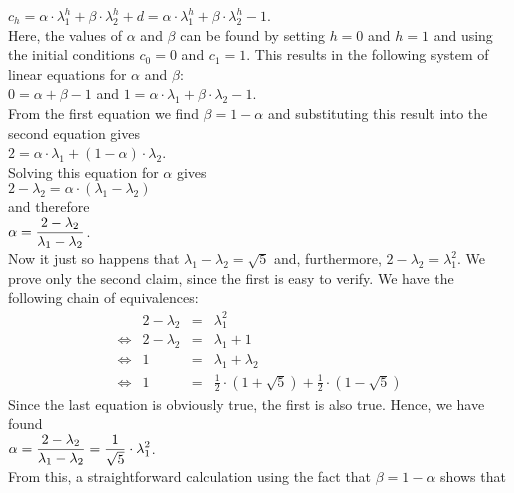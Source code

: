 $c_h = \alpha \cdot \lambda_1^h + \beta \cdot \lambda_2^h + d =\alpha \cdot \lambda_1^h + \beta \cdot \lambda_2^h - 1$.
\\[0.2cm]
Here, the values of $\alpha$ and $\beta$ can be found by setting $h=0$ and $h=1$ and using the
initial conditions $c_0 = 0$ and $c_1 = 1$.  This results in
the following system of linear equations for  $\alpha$ and $\beta$:
\\[0.2cm]
\hspace*{1.3cm}
$0 = \alpha + \beta - 1$ \quad and \quad
$1 = \alpha \cdot \lambda_1 + \beta \cdot \lambda_2 - 1$.
\\[0.2cm]
From the first equation we find $\beta = 1-\alpha$ and substituting this result into the second equation
gives
\\[0.2cm]
\hspace*{1.3cm}
$2 = \alpha \cdot \lambda_1 + (1-\alpha) \cdot \lambda_2$.
\\[0.2cm]
Solving this equation for $\alpha$ gives
\\[0.2cm]
\hspace*{1.3cm}
$2 - \lambda_2 = \alpha \cdot (\lambda_1 - \lambda_2)$
\\[0.2cm]
and therefore
\\[0.2cm]
\hspace*{1.3cm}
$\displaystyle \alpha = \frac{2 - \lambda_2}{\lambda_1 - \lambda_2}$.
\\[0.2cm]
Now it just so happens that $\lambda_1 - \lambda_2 = \sqrt{5}$ and, furthermore, $2 - \lambda_2 = \lambda_1^2$.
We prove only the second claim, since the first is easy to verify.  We have the following
chain of equivalences:
$$
\begin{array}{crcl}
                  & 2 - \lambda_2 & = & \lambda_1^2            \\[0.2cm]
  \Leftrightarrow & 2 - \lambda_2 & = & \lambda_1 + 1          \\[0.2cm]
  \Leftrightarrow & 1             & = & \lambda_1 + \lambda_2  \\[0.2cm]
  \Leftrightarrow & 1             & = &\frac{1}{2} \cdot (1 + \sqrt{5}) + \frac{1}{2} \cdot (1 - \sqrt{5}) 
\end{array}
$$
Since the last equation is obviously true, the first is also true.
Hence, we have found
\\[0.2cm]
\hspace*{1.3cm}
$\displaystyle \alpha = \frac{2 - \lambda_2}{\lambda_1 - \lambda_2} = \frac{1}{\sqrt{5}} \cdot \lambda_1^2$.
\\[0.2cm]
From this, a straightforward calculation using the fact that $\beta = 1 - \alpha$ shows that 
